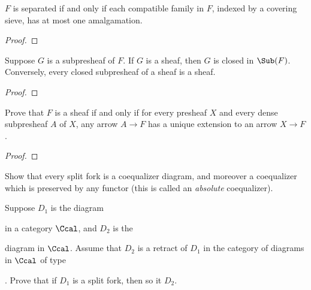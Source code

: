 \begin{exercise}{14}
    $F$ is separated if and only if each compatible family in $F$, indexed by a covering sieve, has at most one amalgamation.
\begin{solution}
    \begin{proof}
    \end{proof}
\end{solution}
\end{exercise}

\begin{exercise}{15}
    Suppose $G$ is a subpresheaf of $F$. If $G$ is a sheaf, then $G$ is closed in $\Sub(F)$. Conversely, every closed subpresheaf of a sheaf is a sheaf.
\begin{solution}
    \begin{proof}
    \end{proof}
\end{solution}
\end{exercise}

\begin{exercise}{16}
    Prove that $F$ is a sheaf if and only if for every presheaf $X$ and every dense subpresheaf $A$ of $X$, any arrow $A\to F$ has a unique extension to an arrow $X\to F$.
\begin{solution}
    \begin{proof}
    \end{proof}
\end{solution}
\end{exercise}

\begin{exercise}{17}
    Show that every split fork is a coequalizer diagram, and moreover a coequalizer which is preserved by any functor (this is called an \textit{absolute} coequalizer).
\begin{solution}
\end{solution}
\end{exercise}

\begin{exercise}{18}
    Suppose $D_1$ is the diagram 
    in a category $\Ccal$, and $D_2$ is the 
    diagram in $\Ccal$. Assume that $D_2$ is a retract of $D_1$ in the category of diagrams in $\Ccal$ of type 
    .
    Prove that if $D_1$ is a split fork, then so it $D_2$.
\begin{solution}
\end{solution}
\end{exercise}